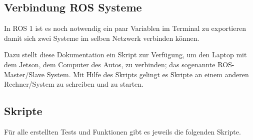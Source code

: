 \subsection{Verbindung ROS Systeme}
In ROS 1 ist es noch notwendig ein paar Variablen im Terminal zu exportieren damit sich zwei Systeme im selben Netzwerk verbinden können.

Dazu stellt diese Dokumentation ein Skript zur Verfügung, um den Laptop mit dem Jetson, dem Computer des Autos, zu verbinden; das sogenannte  ROS-Master/Slave System. 
Mit Hilfe des Skripts gelingt es Skripte an einem anderen Rechner/System zu schreiben und zu starten.

\subsection{Skripte}
Für alle erstellten Tests und Funktionen gibt es jeweils die folgenden Skripte.

